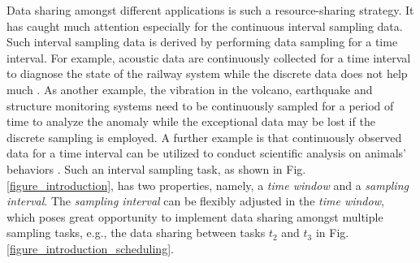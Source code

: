 \documentclass[prodmode,acmtosn]{acmsmall}
\begin{document}
Data sharing amongst different applications is such a resource-sharing strategy. It has caught much attention especially for the continuous interval sampling data. Such interval sampling data is derived by performing data sampling for a time interval. For example, acoustic data are continuously collected for a time interval to diagnose the state of the railway system while the discrete data does not help much \cite{2005acoustic_diagnose_train}. As another example, the vibration in the volcano, earthquake \cite{2007sensys_earthquake_monitor} and structure monitoring systems \cite{2004structuralMonitoring} need to be continuously sampled for a period of time to analyze the anomaly while the exceptional data may be lost if the  discrete sampling is employed. A further example is that continuously observed data for a time interval can be utilized to conduct scientific analysis on animals' behaviors \cite{2004habitat_monitoring}. Such an interval sampling task, as shown in Fig. \ref{figure_introduction}, has two properties, namely, a \emph{time window} and a \emph{sampling interval}. The \emph{sampling interval} can be flexibly adjusted in the \emph{time window}, which poses great opportunity to implement data sharing amongst multiple sampling tasks, e.g., the data sharing between tasks $t_2$ and $t_3$ in Fig. \ref{figure_introduction_scheduling}.
\end{document}
